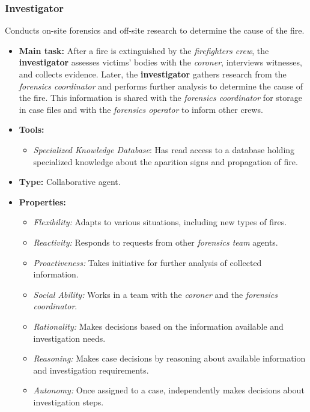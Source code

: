 \subsubsection{Investigator}
Conducts on-site forensics and off-site research to determine the cause of the fire.
\begin{itemize}
    \item \textbf{Main task:} After a fire is extinguished by the \textit{firefighters crew}, the \textbf{investigator} assesses victims' bodies with the \textit{coroner}, interviews witnesses, and collects evidence. Later, the \textbf{investigator} gathers research from the \textit{forensics coordinator} and performs further analysis to determine the cause of the fire. This information is shared with the \textit{forensics coordinator} for storage in case files and with the \textit{forensics operator} to inform other crews.
    \item \textbf{Tools:}
    \begin{itemize}
        \item \textit{Specialized Knowledge Database}: Has read access to a database holding specialized knowledge about the aparition signs and propagation of fire.
    \end{itemize}
    \item \textbf{Type:} Collaborative agent.
    \item \textbf{Properties:}
    \begin{itemize}
        \item \textit{Flexibility:} Adapts to various situations, including new types of fires.
        \item \textit{Reactivity:} Responds to requests from other \textit{forensics team} agents.
        \item \textit{Proactiveness:} Takes initiative for further analysis of collected information.
        \item \textit{Social Ability:} Works in a team with the \textit{coroner} and the \textit{forensics coordinator}.
        \item \textit{Rationality:} Makes decisions based on the information available and investigation needs.
        \item \textit{Reasoning:} Makes case decisions by reasoning about available information and investigation requirements.
        \item \textit{Autonomy:} Once assigned to a case, independently makes decisions about investigation steps.
    \end{itemize}
\end{itemize}
